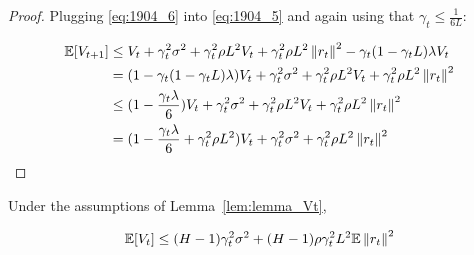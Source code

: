 \begin{proof}
    Plugging \eqref{eq:1904_6} into \eqref{eq:1904_5} and again using that $\gamma_{t} \leq \frac{1}{6L}$:

    \begin{align}
        \mathbb{E} [V_{t+1}]
        &\leq
        V_t 
        + \gamma_{t}^2 \sigma^2 + \gamma_{t}^2 \rho L^2 V_t + \gamma_{t}^2 \rho L^2 \left\|r_t\right\|^2
        - \gamma_{t} (1 - \gamma_{t} L) \lambda V_t \\
        &=
        (1 - \gamma_{t} (1 - \gamma_{t} L) \lambda) V_t
        + \gamma_{t}^2 \sigma^2 + \gamma_{t}^2 \rho L^2 V_t + \gamma_{t}^2 \rho L^2 \left\|r_t\right\|^2 \\
        &\leq
        (1 - \frac {\gamma_{t} \lambda}{6}) V_t
        + \gamma_{t}^2 \sigma^2 + \gamma_{t}^2 \rho L^2 V_t + \gamma_{t}^2 \rho L^2 \left\|r_t\right\|^2 \\
        &=
        (1 - \frac {\gamma_{t} \lambda}{6} + \gamma_{t}^2 \rho L^2) V_t
        +  \gamma_{t}^2 \sigma^2 + \gamma_{t}^2 \rho L^2 \left\|r_t\right\|^2
        \label{eq:1904_7} 
    \end{align}     
\end{proof}


\begin{sublemma} \label{sublem:vt>0}
Under the assumptions of Lemma~\ref{lem:lemma_Vt},

    \begin{align}
        \mathbb{E} [V_t] 
        \leq
         (H-1) \gamma_{t}^2 \sigma^2 +
        (H-1) \rho \gamma_{t}^2 L^2 \mathbb{E} \left\|r_t\right\|^2
    \end{align}

\end{sublemma}

